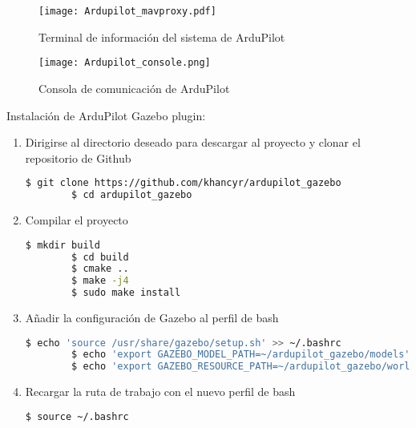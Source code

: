 \begin{figure}[ht]
    \centering
    \texttt{[image: Ardupilot\_mavproxy.pdf]}
    \caption{Terminal de información del sistema de ArduPilot}
    \label{fig:Ardupilot_mavproxy}
\end{figure}

\begin{figure}[ht]
    \centering
    \texttt{[image: Ardupilot\_console.png]}
    \caption{Consola de comunicación de ArduPilot}
    \label{fig:Ardupilot_console}
\end{figure}


Instalación de ArduPilot Gazebo plugin:

\begin{enumerate}
    \item Dirigirse al directorio deseado para descargar al proyecto y clonar el repositorio de Github

    \begin{lstlisting}[language = bash]
        $ git clone https://github.com/khancyr/ardupilot_gazebo
        $ cd ardupilot_gazebo
    \end{lstlisting}  

    \item Compilar el proyecto

    \begin{lstlisting}[language = bash]
        $ mkdir build
        $ cd build
        $ cmake ..
        $ make -j4
        $ sudo make install
    \end{lstlisting} 

    \item Añadir la configuración de Gazebo al perfil de bash

    \begin{lstlisting}[language = bash]
        $ echo 'source /usr/share/gazebo/setup.sh' >> ~/.bashrc
        $ echo 'export GAZEBO_MODEL_PATH=~/ardupilot_gazebo/models' >> ~/.bashrc
        $ echo 'export GAZEBO_RESOURCE_PATH=~/ardupilot_gazebo/worlds:${GAZEBO_RESOURCE_PATH}' >> ~/.bashrc
    \end{lstlisting} 

    \item Recargar la ruta de trabajo con el nuevo perfil de bash
    
    \begin{lstlisting}[language = bash]
        $ source ~/.bashrc
    \end{lstlisting} 

\end{enumerate}

